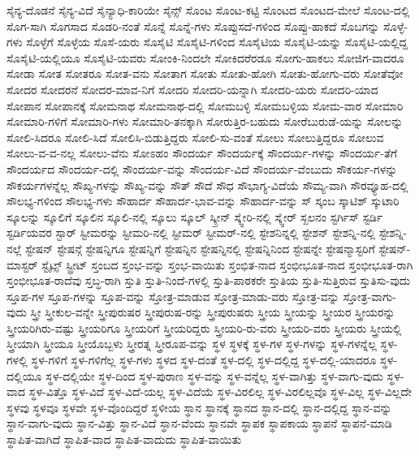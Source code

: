 {ಸೈನ್ಯ-ದೊಡನೆ
ಸೈನ್ಯ-ವಿದೆ
ಸೈನ್ಯಾಧಿ-ಕಾರಿಯೇ
ಸೈನ್ಸ್
ಸೊಂಟ
ಸೊಂಟ-ಕಟ್ಟಿ
ಸೊಂಟದ
ಸೊಂಟದ-ಮೇಲೆ
ಸೊಂಟ-ದಲ್ಲಿ
ಸೊಗ-ಸಾಗಿ
ಸೊಗಸಾದ
ಸೊಡರಿ-ನಂತೆ
ಸೊನ್ನೆ
ಸೊನ್ನೆ-ಗಳು
ಸೊಪ್ಪುಸದೆ-ಗಳಿಂದ
ಸೊಪ್ಪು-ಹಾಕದೆ
ಸೊಬಗನ್ನು
ಸೊಳ್ಳೆ-ಗಳು
ಸೊಳ್ಳೆಗೆ
ಸೊಳ್ಳೆಯ
ಸೊಸೆ-ಯರು
ಸೊಸೈಟಿ
ಸೊಸೈಟಿ-ಗಳಿಂದ
ಸೊಸೈಟಿಯ
ಸೊಸೈಟಿ-ಯನ್ನು
ಸೊಸೈಟಿ-ಯಲ್ಲಿದ್ದ
ಸೊಸೈಟಿ-ಯಲ್ಲಿಯೂ
ಸೊಸೈಟಿ-ಯವರು
ಸೋಂಕಿ-ನಿಂದಲೇ
ಸೋಕಿದರೆರಡೂ
ಸೋಗು-ಹಾಕಲು
ಸೋಜಿಗ-ವಾದರೂ
ಸೋಡಾ
ಸೋತ
ಸೋತರೂ
ಸೋತ-ವನು
ಸೋತಾಗ
ಸೋತು
ಸೋತು-ಹೋಗಿ
ಸೋತು-ಹೋಗು-ವರು
ಸೋತೆವೋ
ಸೋದರ
ಸೋದರನೆ
ಸೋದರ-ಮಾವ-ನಿಗೆ
ಸೋದರಿ
ಸೋದರಿ-ಯನ್ನಾಗಿ
ಸೋದರಿ-ಯರು
ಸೋದರಿ-ಯಾದ
ಸೋಪಾನ
ಸೋಪಾನಕ್ಕೆ
ಸೋಮನಾಥ
ಸೋಮನಾಥ-ದಲ್ಲಿ
ಸೋಮಬಳ್ಳಿ
ಸೋಮಬಳ್ಳಿಯ
ಸೋಮ-ವಾರ
ಸೋಮಾರಿ
ಸೋಮಾರಿ-ಗಳಿಗೆ
ಸೋಮಾರಿ-ಗಳು
ಸೋಮಾರಿ-ತನಕ್ಕಾಗಿ
ಸೋರುತ್ತಿರ-ಬಹುದು
ಸೋರೆಬುರುಡೆ-ಯನ್ನು
ಸೋಲನ್ನು
ಸೋಲಿ-ಸಿದರೂ
ಸೋಲಿ-ಸಿದೆ
ಸೋಲಿಸಿ-ಬಿಡುತ್ತಿದ್ದರು
ಸೋಲಿ-ಸು-ವಂತೆ
ಸೋಲು
ಸೋಲುತ್ತಿದ್ದರೂ
ಸೋಲುವ
ಸೋಲು-ವ-ವ-ನಲ್ಲ
ಸೋಲು-ವೆನು
ಸೋಽಹಂ
ಸೌಂದರ್ಯ
ಸೌಂದರ್ಯಕ್ಕೆ
ಸೌಂದರ್ಯ-ಗಳನ್ನು
ಸೌಂದರ್ಯ-ತೆಗೆ
ಸೌಂದರ್ಯದ
ಸೌಂದರ್ಯ-ದಲ್ಲಿ
ಸೌಂದರ್ಯ-ವನ್ನು
ಸೌಂದರ್ಯ-ವಿದೆ
ಸೌಂದರ್ಯ-ವೆಂಬುದು
ಸೌಕರ್ಯ-ಗಳನ್ನು
ಸೌಕರ್ಯಗಳನ್ನೆಲ್ಲ
ಸೌಖ್ಯ-ಗಳನ್ನು
ಸೌಖ್ಯ-ವನ್ನು
ಸೌತ್
ಸೌದೆ
ಸೌಧ
ಸೌಭಾಗ್ಯ-ವಿದೆಯೆ
ಸೌಮ್ಯ-ವಾಗಿ
ಸೌರವ್ಯೂಹ-ದಲ್ಲಿ
ಸೌಲಭ್ಯ-ಗಳಿಂದ
ಸೌಲಭ್ಯ-ಗಳು
ಸೌಹಾರ್ದ
ಸೌಹಾರ್ದ-ಭಾವ-ವನ್ನು
ಸೌಹಾರ್ದ-ವನ್ನು
ಸ್
ಸ್ಕಂಬ
ಸ್ಕಾಟಿಶ್
ಸ್ಕುಟಾರಿ
ಸ್ಕೂಲನ್ನು
ಸ್ಕೂಲಿಗೆ
ಸ್ಕೂಲಿನ
ಸ್ಕೂಲಿ-ನಲ್ಲಿ
ಸ್ಕೂಲು
ಸ್ಕೂಲ್
ಸ್ಕ್ರೀನ್
ಸ್ಕ್ವೇರಿ-ನಲ್ಲಿ
ಸ್ಕ್ವೇರ್
ಸ್ಖಲನಂ
ಸ್ಟರ್ಗಿಸ್
ಸ್ಟರ್ಡಿ
ಸ್ಟರ್ಡಿಯವರ
ಸ್ಟಾರ್
ಸ್ಟೀಮರನ್ನು
ಸ್ಟೀಮರಿ-ನಲ್ಲಿ
ಸ್ಟೀಮರ್
ಸ್ಟೀಮರ್-ನಲ್ಲಿ
ಸ್ಟೇಶನಿನ್ನಲ್ಲಿ
ಸ್ಟೇಶನ್
ಸ್ಟೇಶನ್ನಿ-ನಲ್ಲಿ
ಸ್ಟೇಶನ್ನಿ-ನಲ್ಲೆ
ಸ್ಟೇಷನ್
ಸ್ಟೇಷನ್ಗೆ
ಸ್ಟೇಷನ್ನಿಗೂ
ಸ್ಟೇಷನ್ನಿಗೆ
ಸ್ಟೇಷನ್ನಿನ
ಸ್ಟೇಷನ್ನಿನಲ್ಲಿ
ಸ್ಟೇಷನ್ನಿನಿಂದ
ಸ್ಟೇಷನ್ನೇ
ಸ್ಟೇಷನ್ಮಾಸ್ಟರಿಗೆ
ಸ್ಟೇಷನ್-ಮಾಸ್ಟರ್
ಸ್ಟೈಟ್ಸ್
ಸ್ಟ್ರೀಟ್
ಸ್ತಂಬದ
ಸ್ತಂಭ-ವನ್ನು
ಸ್ತಂಭ-ವಾಯಿತು
ಸ್ತಂಭಿತ-ನಾದ
ಸ್ತಂಭೀಭೂತ-ನಾದ
ಸ್ತಂಭೀಭೂತ-ರಾಗಿ
ಸ್ತಂಭೀಭೂತ-ರಾದೆವು
ಸ್ತಬ್ಧ-ರಾಗಿ
ಸ್ತುತಿ
ಸ್ತುತಿ-ನಿಂದೆ-ಗಳಲ್ಲಿ
ಸ್ತುತಿ-ಪಾಠಕರೇ
ಸ್ತುತಿಯ
ಸ್ತುತಿ-ಸುತ್ತಿರುವ
ಸ್ತುತಿಸು-ವುದು
ಸ್ತೂಪ-ಗಳ
ಸ್ತೂಪ-ಗಳನ್ನು
ಸ್ತೂಪ-ವನ್ನು
ಸ್ತೋತ್ರ-ಮಾಡುವ
ಸ್ತೋತ್ರ-ಮಾಡು-ವರು
ಸ್ತೋತ್ರ-ವನ್ನು
ಸ್ತೋತ್ರ-ವಾಗು-ವುದು
ಸ್ತ್ರೀ
ಸ್ತ್ರೀಕುಲ-ವನ್ನೇ
ಸ್ತ್ರೀಪುರುಷರ
ಸ್ತ್ರೀಪುರುಷ-ರನ್ನು
ಸ್ತ್ರೀಪುರುಷರು
ಸ್ತ್ರೀಯ
ಸ್ತ್ರೀಯನ್ನು
ಸ್ತ್ರೀಯರ
ಸ್ತ್ರೀಯರನ್ನು
ಸ್ತ್ರೀಯರಿಗಿರು-ವಷ್ಟು
ಸ್ತ್ರೀಯರಿಗೂ
ಸ್ತ್ರೀಯರಿಗೆ
ಸ್ತ್ರೀಯರಿದ್ದರು
ಸ್ತ್ರೀಯರಿ-ರು-ವರು
ಸ್ತ್ರೀಯರಿ-ವರು
ಸ್ತ್ರೀಯರು
ಸ್ತ್ರೀಯಲ್ಲಿ
ಸ್ತ್ರೀಯಾಗಿ
ಸ್ತ್ರೀಯೂ
ಸ್ತ್ರೀಯೊಬ್ಬಳು
ಸ್ತ್ರೀರತ್ನ
ಸ್ತ್ರೀರೂಪ-ವನ್ನು
ಸ್ಥಳ
ಸ್ಥಳಕ್ಕೆ
ಸ್ಥಳ-ಗಳ
ಸ್ಥಳ-ಗಳನ್ನು
ಸ್ಥಳ-ಗಳನ್ನೆಲ್ಲ
ಸ್ಥಳ-ಗಳಲ್ಲಿ
ಸ್ಥಳ-ಗಳಿಗೆ
ಸ್ಥಳ-ಗಳಿಗೆಲ್ಲ
ಸ್ಥಳ-ಗಳು
ಸ್ಥಳದ
ಸ್ಥಳ-ದಂತೆ
ಸ್ಥಳ-ದಲ್ಲಿ
ಸ್ಥಳ-ದಲ್ಲಿದ್ದ
ಸ್ಥಳ-ದಲ್ಲಿ-ಯಾದರೂ
ಸ್ಥಳ-ದಲ್ಲಿಯೂ
ಸ್ಥಳ-ದಲ್ಲಿಯೇ
ಸ್ಥಳ-ದಿಂದ
ಸ್ಥಳ-ಪುರಾಣ
ಸ್ಥಳ-ವನ್ನು
ಸ್ಥಳ-ವನ್ನೆಲ್ಲ
ಸ್ಥಳ-ವಾಗಿತ್ತು
ಸ್ಥಳ-ವಾಗು-ವುದು
ಸ್ಥಳ-ವಾದ
ಸ್ಥಳ-ವಿತ್ತೊ
ಸ್ಥಳ-ವಿದೆ
ಸ್ಥಳ-ವಿದೆ-ಯಲ್ಲ
ಸ್ಥಳ-ವಿದೆಯೆ
ಸ್ಥಳ-ವಿರಲಿಲ್ಲ
ಸ್ಥಳ-ವಿರಲಿಲ್ಲವೊ
ಸ್ಥಳ-ವಿಲ್ಲ
ಸ್ಥಳ-ವಿಲ್ಲದೇ
ಸ್ಥಳವು
ಸ್ಥಳವೂ
ಸ್ಥಳವೇ
ಸ್ಥಳ-ವೊಂದಿದ್ದರೆ
ಸ್ಥಳೀಯ
ಸ್ಥಾನ
ಸ್ಥಾನಕ್ಕೆ
ಸ್ಥಾನದ
ಸ್ಥಾನ-ದಲ್ಲಿ
ಸ್ಥಾನ-ದಲ್ಲಿದ್ದ
ಸ್ಥಾನ-ವನ್ನು
ಸ್ಥಾನ-ವಾಗು-ವುದು
ಸ್ಥಾನ-ವಿತ್ತು
ಸ್ಥಾನ-ವಿದೆ
ಸ್ಥಾನ-ವೆಂದು
ಸ್ಥಾನವೇ
ಸ್ಥಾಪಕ
ಸ್ಥಾಪಕಾಯ
ಸ್ಥಾಪನೆ
ಸ್ಥಾಪನೆ-ಮಾಡಿ
ಸ್ಥಾಪಿತ-ವಾಗಿದೆ
ಸ್ಥಾಪಿತ-ವಾದ
ಸ್ಥಾಪಿತ-ವಾದುದು
ಸ್ಥಾಪಿತ-ವಾಯಿತು
}
